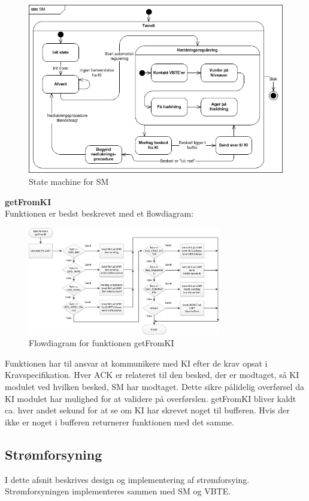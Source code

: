 \begin{figure}[H]
	\centering
	\includegraphics[width=.8\textwidth]{billeder/stmSM}
	\caption{State machine for SM}
	\label{fig:SMSTM}
\end{figure}
\textbf{getFromKI}\\
Funktionen er bedst beskrevet med et flowdiagram:
\begin{figure}[H]
	\centering
	\includegraphics[width=0.75\textwidth]{billeder/getFromKIflowchart}
	\caption{Flowdiagram for funktionen getFromKI}
	\label{fig:gFKIfc}
\end{figure}
Funktionen har til ansvar at kommunikere med KI efter de krav opsat i Kravspecifikation. Hver ACK er relateret til den besked, der er modtaget, så KI modulet ved hvilken besked, SM har modtaget. Dette sikre pålidelig overførsel da KI modulet har mulighed for at validere på overførslen. getFromKI bliver kaldt ca. hver andet sekund for at se om KI har skrevet noget til bufferen. Hvis der ikke er noget i bufferen returnerer funktionen med det samme.\\
\subsection{Strømforsyning}
I dette afsnit beskrives design og implementering af strømforsying. Strømforsyningen implementeres sammen med SM og VBTE.
